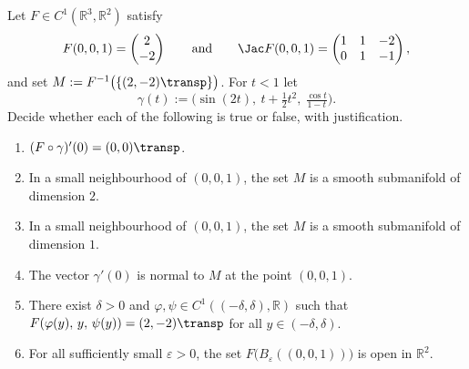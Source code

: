 \begin{exercise}
\label{ex:level_set_of_a_wide_jacobian}
Let $F \in C^1(\mathbb{R}^3,\mathbb{R}^2)$ satisfy
\[F(0,0,1) = \begin{pmatrix} 2 \\ -2\end{pmatrix} \qquad\text{and}\qquad
  \Jac F(0,0,1) = \begin{pmatrix} 1 & 1 & -2 \\ 0 & 1 & -1\end{pmatrix},\]
and set $M := F^{-1}\big(\{(2,-2)\transp\}\big)$. For $t < 1$ let
\[\gamma(t) := \Big(\sin(2t),\ t+\tfrac12t^2,\ \tfrac{\cos t}{1-t}\Big).\]
Decide whether each of the following is true or false, with justification.
\begin{enumerate}[label=\textbf{(\alph*)}]
  \item $(F\circ\gamma)'(0) = (0,0)\transp$.
  \item In a small neighbourhood of $(0,0,1)$, the set $M$ is a smooth submanifold of
    dimension $2$.
  \item In a small neighbourhood of $(0,0,1)$, the set $M$ is a smooth submanifold of
    dimension $1$.
  \item The vector $\gamma'(0)$ is normal to $M$ at the point $(0,0,1)$.
  \item There exist $\delta > 0$ and $\varphi,\psi \in C^1((-\delta,\delta),\mathbb{R})$ such
    that $F(\varphi(y),\,y,\,\psi(y)) = (2,-2)\transp$ for all $y \in (-\delta,\delta)$.
  \item For all sufficiently small $\varepsilon > 0$, the set
    $F\big(B_\varepsilon((0,0,1))\big)$ is open in $\mathbb{R}^2$.
\end{enumerate}
\end{exercise}

